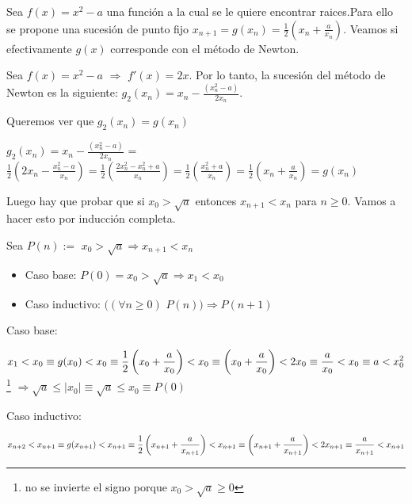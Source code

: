 Sea $f(x) = x^2 -a$ una funci\'on a la cual se le quiere encontrar raices.Para ello se propone una sucesi\'on de punto fijo $x_{n+1} = g(x_n) = \frac{1}{2}\left(x_n+ \frac{a}{x_n}\right)$. Veamos si efectivamente $g(x)$ corresponde con el m\'etodo de Newton.

Sea $f(x) = x^2 - a$ $\Rightarrow$ $f'(x) = 2x$. Por lo tanto, la sucesi\'on del m\'etodo de Newton es la siguiente: $g_{2}(x_n) = x_n - \frac{(x_{n}^2 -a)}{2x_n}$. 

Queremos ver que $g_2(x_n)=g(x_n)$ 

$g_{2}(x_n) = x_n - \frac{(x_{n}^2 -a)}{2x_n}$ = $\frac{1}{2}\left(2x_n - \frac{x_{n}^2 - a}{x_n}\right) = \frac{1}{2}\left(\frac{2x_{n}^2 -x_{n}^2 + a}{x_n}\right) = \frac{1}{2}\left(\frac{x_{n}^2 + a}{x_n}\right) = \frac{1}{2}\left(x_{n} + \frac{a}{x_n}\right) = g(x_n)$

Luego hay que probar que si $x_0 > \sqrt{a}$ entonces $x_{n+1} < x_n$ para $n \geq 0$. Vamos a hacer esto por inducci\'on completa.

Sea $P(n):=$ $x_0 > \sqrt{a} \Rightarrow x_{n+1} < x_{n}$
\begin{itemize}
	\item Caso base: $P(0) = x_0 > \sqrt{a} \Rightarrow x_1 < x_0$
	\item Caso inductivo: $((\forall n\geq 0)$ $P(n)) \Rightarrow P(n+1)$
\end{itemize}

Caso base:
\begin{center}
	$\displaystyle{x_1 < x_0 \equiv g(x_0) < x_0 \equiv \newline}
	\frac{1}{2}\left(x_0 + \frac{a}{x_0}\right) < x_0 \equiv \left(x_0 + \frac{a}{x_0}\right) < 2x_0 \equiv \newline
	\frac{a}{x_0} < x_0 \equiv a < x_{0}^2$ \footnote{no se invierte el signo porque $x_0 > \sqrt{a} \geq 0$}
	$\Rightarrow \sqrt{a} \leq |x_0| \equiv \sqrt{a} \leq x_0 \equiv P(0)$
\end{center}

Caso inductivo:
 
\begin{center}
	$\displaystyle{x_{n+2} < x_{n+1} \equiv g(x_{n+1}) < x_{n+1} \equiv \newline}
	\frac{1}{2}\left(x_{n+1} + \frac{a}{x_{n+1}}\right) < x_{n+1} \equiv \left(x_{n+1} + \frac{a}{x_{n+1}}\right) < 2x_{n+1} \equiv \newline
	\frac{a}{x_{n+1}} < x_{n+1}$
\end{center}

